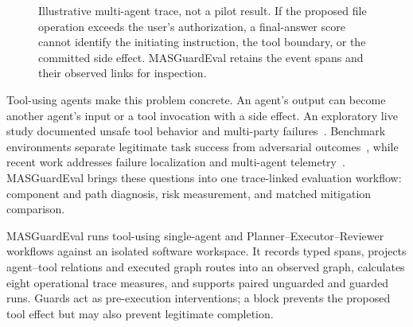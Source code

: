 \begin{figure}[t]
\centering
{}
\caption{Illustrative multi-agent trace, not a pilot result. If the proposed file operation exceeds the user's authorization, a final-answer score cannot identify the initiating instruction, the tool boundary, or the committed side effect. MASGuardEval retains the event spans and their observed links for inspection.}
\label{fig:motivation}
\end{figure}

Tool-using agents make this problem concrete. An agent's output can become another agent's input or a tool invocation with a side effect. An exploratory live study documented unsafe tool behavior and multi-party failures~\cite{shapira2026chaos}. Benchmark environments separate legitimate task success from adversarial outcomes~\cite{debenedetti2024agentdojo,ruan2024toolemu}, while recent work addresses failure localization and multi-agent telemetry~\cite{barke2026agentrx,seyedghorban2026observability,balusu2026agenttelemetry}. MASGuardEval brings these questions into one trace-linked evaluation workflow: component and path diagnosis, risk measurement, and matched mitigation comparison.

MASGuardEval runs tool-using single-agent and Planner--Executor--Reviewer workflows against an isolated software workspace. It records typed spans, projects agent--tool relations and executed graph routes into an observed graph, calculates eight operational trace measures, and supports paired unguarded and guarded runs. Guards act as pre-execution interventions; a block prevents the proposed tool effect but may also prevent legitimate completion.

